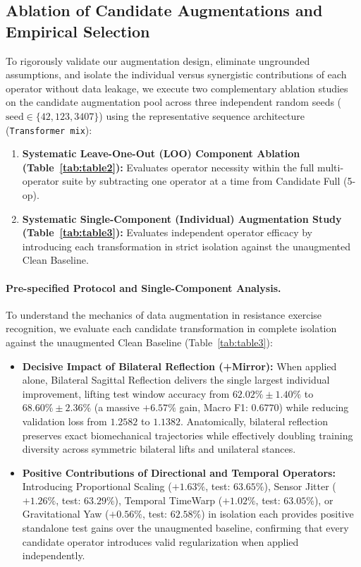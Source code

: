 \documentclass[runningheads]{llncs}
\begin{document}
\subsection{Ablation of Candidate Augmentations and Empirical Selection}\label{sec:exp_aug}
To rigorously validate our augmentation design, eliminate ungrounded assumptions, and isolate the individual versus synergistic contributions of each operator without data leakage, we execute two complementary ablation studies on the candidate augmentation pool across three independent random seeds ($\text{seed} \in \{42, 123, 3407\}$) using the representative sequence architecture (\texttt{Transformer mix}):
\begin{enumerate}
    \item \textbf{Systematic Leave-One-Out (LOO) Component Ablation (Table~\ref{tab:table2}):} Evaluates operator necessity within the full multi-operator suite by subtracting one operator at a time from Candidate Full (5-op).
    \item \textbf{Systematic Single-Component (Individual) Augmentation Study (Table~\ref{tab:table3}):} Evaluates independent operator efficacy by introducing each transformation in strict isolation against the unaugmented Clean Baseline.
\end{enumerate}

\paragraph{Pre-specified Protocol and Single-Component Analysis.}
To understand the mechanics of data augmentation in resistance exercise recognition, we evaluate each candidate transformation in complete isolation against the unaugmented Clean Baseline (Table~\ref{tab:table3}):
\begin{itemize}
    \item \textbf{Decisive Impact of Bilateral Reflection (+Mirror):} When applied alone, Bilateral Sagittal Reflection delivers the single largest individual improvement, lifting test window accuracy from $62.02\% \pm 1.40\%$ to $68.60\% \pm 2.36\%$ (a massive $+6.57\%$ gain, Macro F1: $0.6770$) while reducing validation loss from $1.2582$ to $1.1382$. Anatomically, bilateral reflection preserves exact biomechanical trajectories while effectively doubling training diversity across symmetric bilateral lifts and unilateral stances.
    \item \textbf{Positive Contributions of Directional and Temporal Operators:} Introducing Proportional Scaling ($+1.63\%$, test: $63.65\%$), Sensor Jitter ($+1.26\%$, test: $63.29\%$), Temporal TimeWarp ($+1.02\%$, test: $63.05\%$), or Gravitational Yaw ($+0.56\%$, test: $62.58\%$) in isolation each provides positive standalone test gains over the unaugmented baseline, confirming that every candidate operator introduces valid regularization when applied independently.
\end{itemize}
\end{document}
